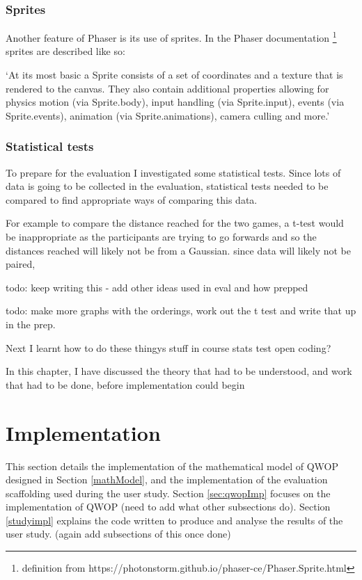 \documentclass[12pt,a4paper,twoside,openright]{report}
\begin{document}
\subsection{Sprites}

Another feature of Phaser is its use of sprites.
In the Phaser documentation \footnote{definition from https://photonstorm.github.io/phaser-ce/Phaser.Sprite.html}
sprites are described like so:

\begin{displayquote}
`At its most basic a Sprite consists of a set of coordinates and a texture that is rendered to the canvas. They also contain additional properties allowing for physics motion (via Sprite.body), input handling (via Sprite.input), events (via Sprite.events), animation (via Sprite.animations), camera culling and more.'
\end{displayquote}

\subsection{Statistical tests}

To prepare for the evaluation I investigated some statistical tests. 
Since lots of data is going to be collected in the evaluation, 
statistical tests needed to be compared to find appropriate ways of comparing this data.

For example to compare the distance reached for the two games, a t-test would be inappropriate 
as the participants are trying to go forwards and so the distances reached will likely not be from a Gaussian.
since data will likely not be paired,

todo: keep writing this - add other ideas used in eval and how prepped

todo: make more graphs with the orderings, work out the t test and write that up in the prep.


Next I learnt how to do these thingys
stuff in course
	stats test
	open coding?

In this chapter, I have discussed the theory that had to be understood, and work that
had to be done, before implementation could begin




\chapter{Implementation}
This section details the implementation of the mathematical model of QWOP 
designed in Section \ref{mathModel}, and the implementation of the evaluation scaffolding used during the user study.
Section \ref{sec:qwopImp} focuses on the implementation of QWOP
(need to add what other subsections do).
Section \ref{studyimpl} explains the code written to produce and analyse the results of the user study.
(again add subsections of this once done) 
\end{document}
